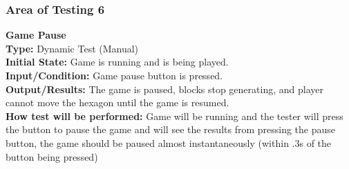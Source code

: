 \documentclass[12pt, titlepage]{article}
\begin{document}
\subsubsection{Area of Testing 6}
\noindent \textbf{Game Pause} \\
\textbf{Type:} Dynamic Test (Manual) \\
\textbf{Initial State:} Game is running and is being played.\\
\textbf{Input/Condition:} Game pause button is pressed. \\ 
\textbf{Output/Results:} The game is paused, blocks stop generating, and player cannot move the hexagon until the game is resumed.\\
\textbf{How test will be performed:} Game will be running and the tester will press the button to pause the game and will see the results from pressing the pause button, the game should be paused almost instantaneously (within .3s of the button being pressed)
\end{document}
